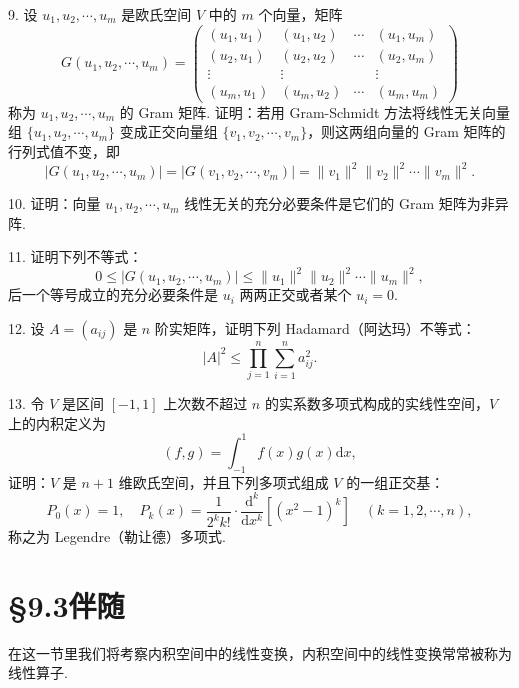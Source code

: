 \documentclass[UTF8, 12pt, fontset=fandol, oneside]{ctexart}
\begin{document}
9. 设 $u_1,u_2,\cdots,u_m$ 是欧氏空间 $V$ 中的 $m$ 个向量，矩阵
\[
  G(u_1,u_2,\cdots,u_m)=
  \left(\begin{array}{cccc}
    (u_1,u_1) & (u_1,u_2) & \cdots & (u_1,u_m)\\
    (u_2,u_1) & (u_2,u_2) & \cdots & (u_2,u_m)\\
    \vdots & \vdots & & \vdots\\
    (u_m,u_1) & (u_m,u_2) & \cdots & (u_m,u_m)
  \end{array}\right)
\]
称为 $u_1,u_2,\cdots,u_m$ 的 Gram 矩阵. 证明：若用 Gram-Schmidt 方法将线性无关向量组 $\{u_1,u_2,\cdots,u_m\}$ 变成正交向量组 $\{v_1,v_2,\cdots,v_m\}$，则这两组向量的 Gram 矩阵的行列式值不变，即
\[
  |G(u_1,u_2,\cdots,u_m)|=|G(v_1,v_2,\cdots,v_m)|
  =\|v_1\|^2\|v_2\|^2\cdots\|v_m\|^2.
\]

10. 证明：向量 $u_1,u_2,\cdots,u_m$ 线性无关的充分必要条件是它们的 Gram 矩阵为非异阵.

11. 证明下列不等式：
\[
  0\le |G(u_1,u_2,\cdots,u_m)|\le \|u_1\|^2\|u_2\|^2\cdots\|u_m\|^2,
\]
后一个等号成立的充分必要条件是 $u_i$ 两两正交或者某个 $u_i=0$.

12. 设 $A=(a_{ij})$ 是 $n$ 阶实矩阵，证明下列 Hadamard（阿达玛）不等式：
\[
  |A|^2\le \prod_{j=1}^n\sum_{i=1}^n a_{ij}^2.
\]

13. 令 $V$ 是区间 $[-1,1]$ 上次数不超过 $n$ 的实系数多项式构成的实线性空间，$V$ 上的内积定义为
\[
  (f,g)=\int_{-1}^1 f(x)g(x)\mathrm dx,
\]
证明：$V$ 是 $n+1$ 维欧氏空间，并且下列多项式组成 $V$ 的一组正交基：
\[
  P_0(x)=1,\quad
  P_k(x)=\frac1{2^kk!}\cdot\frac{\mathrm d^k}{\mathrm dx^k}\left[(x^2-1)^k\right]\quad(k=1,2,\cdots,n),
\]
称之为 Legendre（勒让德）多项式.

\section*{§9.3\quad 伴\quad 随}

在这一节里我们将考察内积空间中的线性变换，内积空间中的线性变换常常被称为线性算子.
\end{document}
